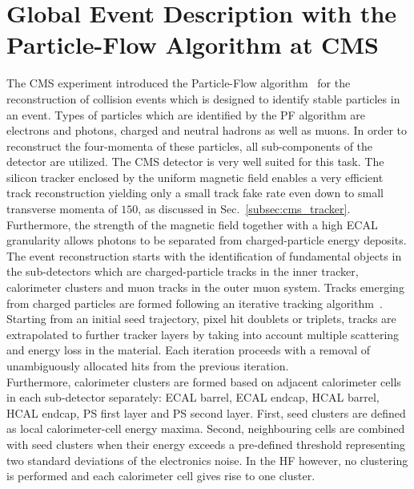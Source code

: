 \section{Global Event Description with the Particle-Flow Algorithm at CMS}
\label{sec:pf_algo}
The CMS experiment introduced the Particle-Flow algorithm~\cite{CMS-PAS-PFT-09-001} for the reconstruction of collision events which is designed to identify stable particles in an event. Types of particles which are identified by the PF algorithm are electrons and photons, charged and neutral hadrons as well as muons. In order to reconstruct the four-momenta of these particles, all sub-components of the detector are utilized. The CMS detector is very well suited for this task. The silicon tracker enclosed by the uniform magnetic field enables a very efficient track reconstruction yielding only a small track fake rate even down to small transverse momenta of $150$\mev, as discussed in Sec.~\ref{subsec:cms_tracker}. Furthermore, the strength of the magnetic field together with a high ECAL granularity allows photons to be separated from charged-particle energy deposits. \\ 
The event reconstruction starts with the identification of fundamental objects in the sub-detectors which are charged-particle tracks in the inner tracker, calorimeter clusters and muon tracks in the outer muon system. Tracks emerging from charged particles are formed following an iterative tracking algorithm~\cite{Adam:934067}. Starting from an initial seed trajectory, \eg pixel hit doublets or triplets, tracks are extrapolated to further tracker layers by taking into account multiple scattering and energy loss in the material. Each iteration proceeds with a removal of unambiguously allocated hits from the previous iteration. \\
Furthermore, calorimeter clusters are formed based on adjacent calorimeter cells in each sub-detector separately: ECAL barrel, ECAL endcap, HCAL barrel, HCAL endcap, PS first layer and PS second layer. First, seed clusters are defined as local calorimeter-cell energy maxima. Second, neighbouring cells are combined with seed clusters when their energy exceeds a pre-defined threshold representing two standard deviations of the electronics noise. In the HF however, no clustering is performed and each calorimeter cell gives rise to one cluster. \\
